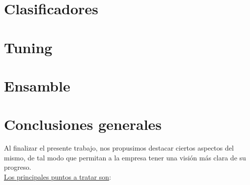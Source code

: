 \documentclass[a4paper ,12pt]{article}
\begin{document}
\newpage
\section{Clasificadores}

\newpage
\section{Tuning}

\newpage
\section{Ensamble}

\newpage
\section{Conclusiones generales}

Al finalizar el presente trabajo, nos propusimos destacar ciertos aspectos del mismo, de tal modo que permitan a la empresa tener una visión más clara de su progreso.\\


\underline{Los principales puntos a tratar son}:
\end{document}
